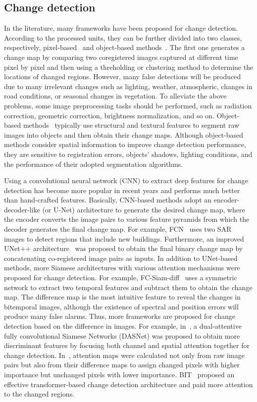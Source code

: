 \documentclass[letterpaper]{article} \usepackage{aaai23}  \usepackage{times}  \usepackage{helvet}  \usepackage{courier}  \usepackage[hyphens]{url}  \usepackage{graphicx} \urlstyle{rm} \def\UrlFont{\rm}  \usepackage{natbib}  \usepackage{caption} \frenchspacing  \setlength{\pdfpagewidth}{8.5in}  \setlength{\pdfpageheight}{11in}  \usepackage{algorithm}
\begin{document}
\subsection{Change detection}
In the literature, many frameworks have been proposed for change detection. According to the processed units, they can be further divided into two classes, respectively, pixel-based~\cite{sdddsad00, 5196726, WU2017241} and object-based methods~\cite{GILYEPES201677, 8335352}. The first one generates a change map by comparing two coregistered images captured at different time pixel by pixel and then using a threholding or clustering method to determine the locations of changed regions. However, many false detections will be produced due to many irrelevant
changes such as lighting, weather, atmospheric, changes in road conditions, or seasonal changes in vegetation. To alleviate the above problems, some image preprocessing tasks should be performed, such as radiation correction, geometric correction, brightness normalization, and so on. Object-based methods~\cite{GILYEPES201677, 8335352} typically use structural and textural features to segment raw images into objects and then obtain their change maps. Although object-based methods consider spatial information to improve change detection performance, they are sensitive to registration errors, objects' shadows, lighting conditions, and the performance of their adopted segmentation algorithms.

Using a convolutional neural network (CNN) to extract deep
features for change detection has become more
popular in recent years and performs much better than hand-crafted features.  Basically, CNN-based methods adopt an encoder-decoder-like (or U-Net) architecture to generate the desired change map, where the encoder converts the image pairs to various feature pyramids from which the decoder generates the final change map. For example, FCN~\cite{aaa123} uses two SAR images to detect regions that include new buildings. Furthermore, an improved UNet++ architecture~\cite{rs11111382} was proposed to obtain the final binary change map by concatenating co-registered image pairs as inputs.  In addition to UNet-based methods, more Siamese architectures with various attention mechanisms were proposed for change detection.  For example,  FC-Siam-diff~\cite{aa8451652} uses a symmetric network to extract two temporal features and subtract them to obtain the change map. The difference map is the most intuitive feature to reveal the changes in bitemporal images, although the existence of spectral and position errors will produce many false alarms. Thus, more frameworks are proposed for change detection based on the difference in images.  For example, in~\cite{DASNet2021}, a dual-attentive fully convolutional Siamese Networks (DASNet) was proposed to obtain more discriminant features by focusing both channel and spatial attention together for change detection.  In~\cite{ZHANG2020183, 9254128}, attention maps were calculated not only from raw image pairs but also from their difference maps to assign changed pixels with higher importance but unchanged pixels with lower importance.  BIT~\cite{c2022} proposed an effective transformer-based change detection architecture and paid more attention to the changed regions.
\vspace{-0.2 em}
\end{document}
